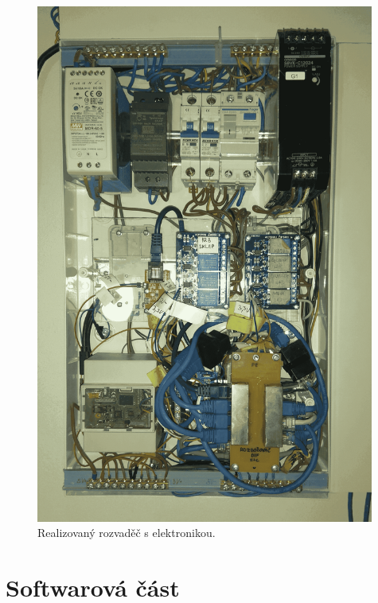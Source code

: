\begin{figure}[H]
    \centering
    \includegraphics[width=0.99\textwidth]{images/rozvadec-ve-sklepe-s-elektronikou.png}
    \caption[Realizovaný rozvaděč s elektronikou.]{Realizovaný rozvaděč s elektronikou.}
    \label{fig:rozvadec-ve-sklepe-s-elektronikou}
\end{figure}

\section{Softwarová část}

